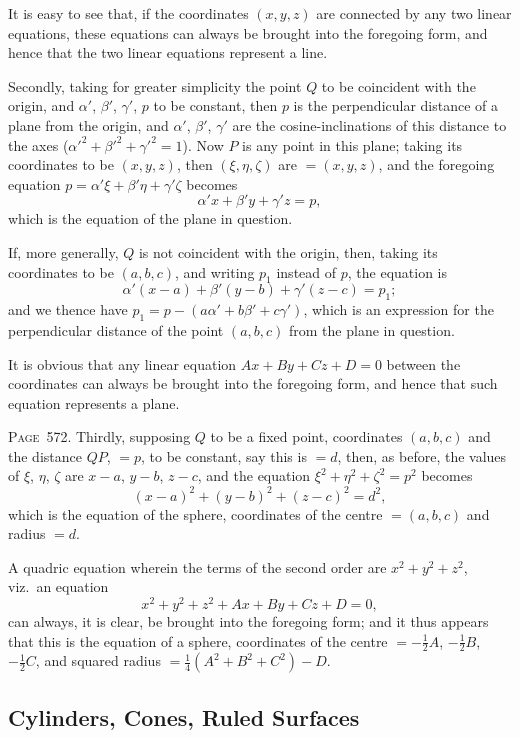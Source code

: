 \documentclass[11pt,a4paper]{book}
\begin{document}
It is easy to see that, if the coordinates $(x,y,z)$ are connected by any two linear equations, these equations can always be brought into the foregoing form, and hence that the two linear equations represent a line.

Secondly, taking for greater simplicity the point $Q$ to be coincident with the origin, and $\alpha'$, $\beta'$, $\gamma'$, $p$ to be constant, then $p$ is the perpendicular distance of a plane from the origin, and $\alpha'$, $\beta'$, $\gamma'$ are the cosine-inclinations of this distance to the axes ($\alpha'^2+\beta'^2+\gamma'^2=1$). Now $P$ is any point in this plane; taking its coordinates to be $(x,y,z)$, then $(\xi,\eta,\zeta)$ are $=(x,y,z)$, and the foregoing equation $p=\alpha'\xi+\beta'\eta+\gamma'\zeta$ becomes
\[
\alpha' x+\beta' y+\gamma' z=p,
\]
which is the equation of the plane in question.

If, more generally, $Q$ is not coincident with the origin, then, taking its coordinates to be $(a,b,c)$, and writing $p_1$ instead of $p$, the equation is
\[
\alpha'(x-a)+\beta'(y-b)+\gamma'(z-c)=p_1;
\]
and we thence have $p_1=p-(a\alpha'+b\beta'+c\gamma')$, which is an expression for the perpendicular distance of the point $(a,b,c)$ from the plane in question.

It is obvious that any linear equation $Ax+By+Cz+D=0$ between the coordinates can always be brought into the foregoing form, and hence that such equation represents a plane.

\newpage
\noindent\textsc{Page~572.} Thirdly, supposing $Q$ to be a fixed point, coordinates $(a,b,c)$ and the distance $QP$, $=p$, to be constant, say this is $=d$, then, as before, the values of $\xi$, $\eta$, $\zeta$ are $x-a$, $y-b$, $z-c$, and the equation $\xi^2+\eta^2+\zeta^2=p^2$ becomes
\[
(x-a)^2+(y-b)^2+(z-c)^2=d^2,
\]
which is the equation of the sphere, coordinates of the centre $=(a,b,c)$ and radius $=d$.

A quadric equation wherein the terms of the second order are $x^2+y^2+z^2$, viz.\ an equation
\[
x^2+y^2+z^2+Ax+By+Cz+D=0,
\]
can always, it is clear, be brought into the foregoing form; and it thus appears that this is the equation of a sphere, coordinates of the centre $=-\tfrac12A$, $-\tfrac12B$, $-\tfrac12C$, and squared radius $=\tfrac14(A^2+B^2+C^2)-D$.

\subsection*{Cylinders, Cones, Ruled Surfaces}
\end{document}
